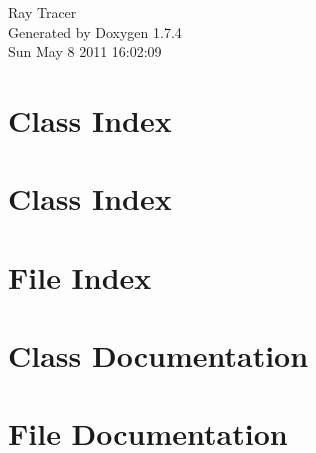 \documentclass[a4paper]{book}
\begin{document}
\hypersetup{pageanchor=false}
\begin{titlepage}
\vspace*{7cm}
\begin{center}
{\Large Ray Tracer }\\
\vspace*{1cm}
{\large Generated by Doxygen 1.7.4}\\
\vspace*{0.5cm}
{\small Sun May 8 2011 16:02:09}\\
\end{center}
\end{titlepage}
\clearemptydoublepage
{}
\tableofcontents
\clearemptydoublepage
{}
\hypersetup{pageanchor=true}
\chapter{Class Index}

\chapter{Class Index}

\chapter{File Index}

\chapter{Class Documentation}

























\chapter{File Documentation}













































\printindex
\end{document}
